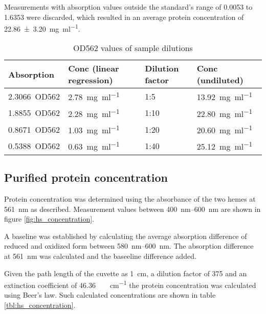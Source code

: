 Measurements with absorption values outside the standard's range of 0.0053 to
1.6353 were discarded, which resulted in an average protein concentration of
\SI{22.86 \pm 3.20}{\mg\per\ml}.

\begin{table*}
	\centering
	\begin{tabu}{llll}
		\toprule
		Absorption & Conc (linear regression) & Dilution factor & Conc (undiluted) \\
		\midrule
		\SI{2.3066}{OD562} & \SI{2.78}{\mg\per\ml} & 1:5  & \SI{13.92}{\mg\per\ml} \\
		\SI{1.8855}{OD562} & \SI{2.28}{\mg\per\ml} & 1:10 & \SI{22.80}{\mg\per\ml} \\
		\SI{0.8671}{OD562} & \SI{1.03}{\mg\per\ml} & 1:20 & \SI{20.60}{\mg\per\ml} \\
		\SI{0.5388}{OD562} & \SI{0.63}{\mg\per\ml} & 1:40 & \SI{25.12}{\mg\per\ml} \\
		\bottomrule
	\end{tabu}
	\caption{OD562 values of sample dilutions}
	\label{tbl:bca_absorption_sample}
\end{table*}

\subsection{Purified protein concentration}

Protein concentration was determined using the absorbance of the two hemes at
\SI{561}{\nm} as described. Measurement values between \SIrange{400}{600}{\nm}
are shown in figure \ref{fig:hs_concentration}.

A baseline was established by calculating the average absorption difference of
reduced and oxidized form between \SIrange{580}{600}{\nm}. The absorption
difference at \SI{561}{\nm} was calculated and the baseeline difference added.

Given the path length of the cuvette as \SI{1}{\cm}, a dilution factor of 375
and an extinction coefficient of \SI{46.36}{\per\milli\Molar\per\cm} the
protein concentration was calculated using Beer's law. Such calculated
concentrations are shown in table \ref{tbl:hs_concentration}.

